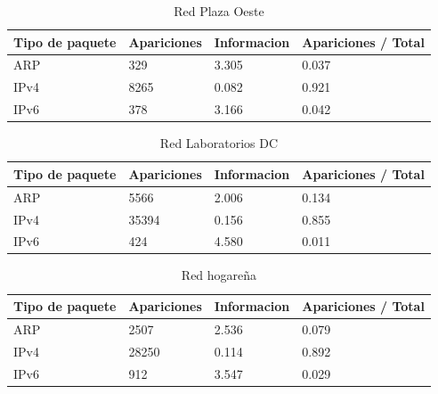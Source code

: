 
\begin{table}[H]
\centering
\caption{Red Plaza Oeste}
\label{my-label}
\begin{tabular}{@{}llll@{}}
\toprule
Tipo de paquete & Apariciones & Informacion & Apariciones / Total \\ \midrule
ARP             & 329         & 3.305       & 0.037               \\
IPv4            & 8265        & 0.082       & 0.921               \\
IPv6            & 378         & 3.166       & 0.042               \\ \bottomrule
\end{tabular}
\end{table}


\begin{table}[H]
\centering
\caption{Red Laboratorios DC}
\label{my-label}
\begin{tabular}{@{}llll@{}}
\toprule
Tipo de paquete & Apariciones & Informacion & Apariciones / Total \\ \midrule
ARP             & 5566        & 2.006       & 0.134               \\
IPv4            & 35394       & 0.156       & 0.855               \\
IPv6            & 424         & 4.580       & 0.011               \\ \bottomrule
\end{tabular}
\end{table}


\begin{table}[H]
\centering
\caption{Red hogareña}
\label{my-label}
\begin{tabular}{@{}llll@{}}
\toprule
Tipo de paquete & Apariciones & Informacion & Apariciones / Total \\ \midrule
ARP             & 2507        & 2.536       & 0.079               \\
IPv4            & 28250       & 0.114       & 0.892               \\
IPv6            & 912         & 3.547       & 0.029               \\ \bottomrule
\end{tabular}
\end{table}


